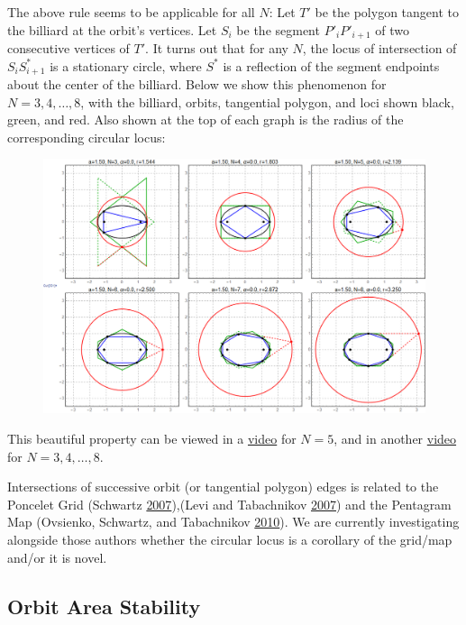 \documentclass[]{article}
\begin{document}
The above rule seems to be applicable for all \(N\): Let \(T'\) be the polygon tangent to the billiard at the orbit's vertices. Let \(S_i\) be the segment \(P'_iP'_{i+1}\) of two consecutive vertices of \(T'\). It turns out that for any \(N\), the locus of intersection of \(S_iS^*_{i+1}\) is a stationary circle, where \(S^*\) is a reflection of the segment endpoints about the center of the billiard. Below we show this phenomenon for \(N=3,4,\ldots,8\), with the billiard, orbits, tangential polygon, and loci shown black, green, and red. Also shown at the top of each graph is the radius of the corresponding circular locus:

\begin{figure}[H]

{\centering \includegraphics[width=1\linewidth]{pics/darboux_circles_3to9} 

}

\end{figure}

This beautiful property can be viewed in a \href{https://youtu.be/dINE4aH1cvk}{video} for \(N=5\), and in another \href{https://youtu.be/EFeINGIDFrg}{video} for \(N=3,4,\ldots,8\).

Intersections of successive orbit (or tangential polygon) edges is related to the Poncelet Grid (Schwartz \protect\hyperlink{ref-schwartz07}{2007}),(Levi and Tabachnikov \protect\hyperlink{ref-sergei07_grid}{2007}) and the Pentagram Map (Ovsienko, Schwartz, and Tabachnikov \protect\hyperlink{ref-sergei10_pentagram}{2010}). We are currently investigating alongside those authors whether the circular locus is a corollary of the grid/map and/or it is novel.

\hypertarget{orbit-area-stability}{%
\subsection{Orbit Area Stability}\label{orbit-area-stability}}
\end{document}
